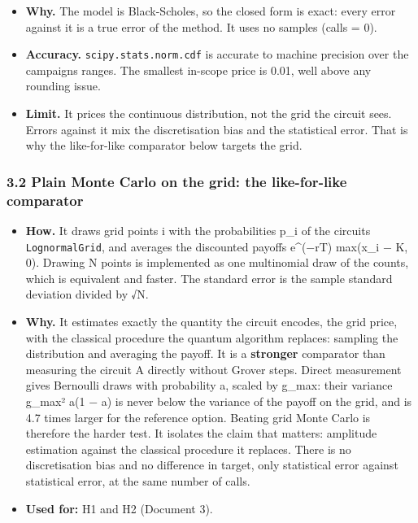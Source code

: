 \documentclass[
  10pt,
]{article}
\providecommand{\tightlist}{%
  \setlength{\itemsep}{0pt}\setlength{\parskip}{0pt}}
\begin{document}
\begin{itemize}
\tightlist
\item
  \textbf{Why.} The model is Black-Scholes, so the closed form is exact:
  every error against it is a true error of the method. It uses no
  samples (calls = 0).
\item
  \textbf{Accuracy.} \texttt{scipy.stats.norm.cdf} is accurate to
  machine precision over the campaign\textquotesingle s ranges. The
  smallest in-scope price is 0.01, well above any rounding issue.
\item
  \textbf{Limit.} It prices the continuous distribution, not the grid
  the circuit sees. Errors against it mix the discretisation bias and
  the statistical error. That is why the like-for-like comparator below
  targets the grid.
\end{itemize}

\hypertarget{32-plain-monte-carlo-on-the-grid-the-like-for-like-comparator}{%
\subsubsection{3.2 Plain Monte Carlo on the grid: the like-for-like
comparator}\label{32-plain-monte-carlo-on-the-grid-the-like-for-like-comparator}}

\begin{itemize}
\tightlist
\item
  \textbf{How.} It draws grid points i with the probabilities p\_i of
  the circuit\textquotesingle s \texttt{LognormalGrid}, and averages the
  discounted payoffs e\^{}(−rT) max(x\_i − K, 0). Drawing N points is
  implemented as one multinomial draw of the counts, which is equivalent
  and faster. The standard error is the sample standard deviation
  divided by √N.
\item
  \textbf{Why.} It estimates exactly the quantity the circuit encodes,
  the grid price, with the classical procedure the quantum algorithm
  replaces: sampling the distribution and averaging the payoff. It is a
  \textbf{stronger} comparator than measuring the circuit A directly
  without Grover steps. Direct measurement gives Bernoulli draws with
  probability a, scaled by g\_max: their variance g\_max² a(1 − a) is
  never below the variance of the payoff on the grid, and is 4.7 times
  larger for the reference option. Beating grid Monte Carlo is therefore
  the harder test. It isolates the claim that matters: amplitude
  estimation against the classical procedure it replaces. There is no
  discretisation bias and no difference in target, only statistical
  error against statistical error, at the same number of calls.
\item
  \textbf{Used for:} H1 and H2 (Document 3).
\end{itemize}
\end{document}

